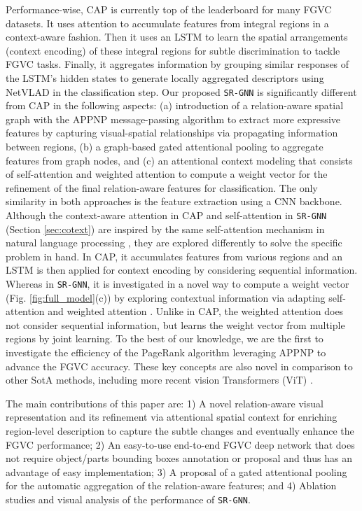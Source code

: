 \documentclass[journal]{IEEEtran}
\begin{document}
Performance-wise, CAP \cite{behera2021context} is currently top of the  leaderboard for many FGVC datasets. It uses attention to accumulate features from integral regions in a context-aware fashion. Then it uses an LSTM to learn the spatial arrangements (context encoding) of these integral regions for subtle discrimination to tackle FGVC tasks. Finally, it aggregates information by grouping similar responses of the LSTM's hidden states to generate locally aggregated descriptors using NetVLAD in the classification step. Our proposed \texttt{SR-GNN} is significantly different from CAP in the following aspects: (a) introduction of a relation-aware spatial graph with the APPNP message-passing algorithm to extract more expressive features by capturing visual-spatial relationships via propagating information between regions, (b) a graph-based gated attentional pooling to aggregate features from graph nodes, and (c) an attentional context modeling that consists of self-attention and weighted attention to compute a weight vector for the refinement of the final relation-aware features for classification. The only similarity in both approaches is the feature extraction using a CNN backbone. Although the context-aware attention in CAP and self-attention in \texttt{SR-GNN} (Section \ref{sec:cotext}) are inspired by the same self-attention mechanism in natural language processing \cite{vaswani2017attention}, they are explored differently to solve the specific problem in hand. In CAP, it accumulates features from various regions and an LSTM is then applied for context encoding by considering sequential information. Whereas in \texttt{SR-GNN}, it is investigated in a novel way to compute a weight vector (Fig. \ref{fig:full_model}(c)) by exploring contextual information via adapting self-attention \cite{vaswani2017attention} and weighted attention \cite{BahdanauCB14}. Unlike in CAP, the weighted attention does not consider sequential information, but learns the weight vector from multiple regions by joint learning. To the best of our knowledge, we are the first to investigate the efficiency of the PageRank algorithm leveraging APPNP to advance the FGVC accuracy. These key concepts are also novel in comparison to other SotA methods, including more recent vision Transformers (ViT) \cite{dosovitskiy2020image,liu2021swin, he2021transfg, miao2021complemental}. 

The main contributions of this paper are: 
1) A novel relation-aware visual representation and its refinement via attentional spatial context for enriching region-level description to capture the subtle changes and eventually enhance the FGVC performance; 2) An easy-to-use end-to-end FGVC deep network that does not require object/parts bounding boxes annotation or proposal and thus has an advantage of easy implementation; 
3) A proposal of a gated attentional pooling for the automatic aggregation of the relation-aware features; and
4) Ablation studies and visual analysis of the performance of
\texttt{SR-GNN}. 
\end{document}
